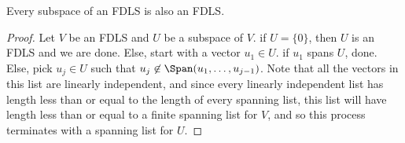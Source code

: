 \documentclass{article}
\begin{document}
  \begin{prop}\label{prop:subspace.fdls}
    Every subspace of an FDLS is also an FDLS.
  \end{prop}
  \begin{proof}
    Let $V$ be an FDLS and $U$ be a subspace of $V$. if $U = \{0\}$, then $U$ is an FDLS and we are done. Else, start with a vector $u_1 \in U$. if $u_1$ spans $U$, done.
    Else, pick $u_j \in U$ such that $u_j \not\in \Span(u_1, \dots, u_{j - 1})$. Note that all the vectors in this list are linearly independent, and since every linearly
    independent list has length less than or equal to the length of every spanning list, this list will have length less than or equal to a finite spanning list for $V$, and
    so this process terminates with a spanning list for $U$.
  \end{proof}
\end{document}
